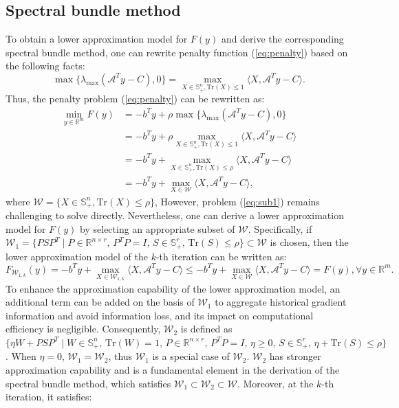 \documentclass{jcmlatex}
\begin{document}
\subsection{Spectral bundle method}
To obtain a lower approximation model for \(F(y)\) and derive the corresponding spectral bundle method, one can rewrite penalty function (\ref{eq:penalty}) based on the following facts:
\begin{equation*}
\max\{\lambda_{\max}(\mathcal{A}^{T}y-C),0\}=\underset{X\in \mathbb{S}^{n}_{+},\text{Tr}(X)\leq 1}{\max}\langle X,\mathcal{A}^{T}y-C\rangle.
\end{equation*}
Thus, the penalty problem (\ref{eq:penalty}) can be rewritten as:
\begin{equation}\label{eq:sub1}
\begin{aligned}
\underset{y\in \mathbb{R}^{m}}{\min}F(y)&=-b^{T}y+\rho\max\{\lambda_{\max}(\mathcal{A}^{T}y-C),0\}\\
&=-b^{T}y+\rho\underset{X\in \mathbb{S}^{n}_{+},\text{Tr}(X)\leq 1}{\max}\langle X,\mathcal{A}^{T}y-C\rangle\\ 
&=-b^{T}y+\underset{X\in \mathbb{S}^{n}_{+},\text{Tr}(X)\leq \rho}{\max}\langle X,\mathcal{A}^{T}y-C\rangle\\ 
&=-b^{T}y+\underset{X\in \mathcal{W}}{\max}\langle X,\mathcal{A}^{T}y-C\rangle,
\end{aligned}
\end{equation}
where \(\mathcal{W}=\{X\in \mathbb{S}^{n}_{+},\text{Tr}(X)\leq \rho\}\), However, problem (\ref{eq:sub1}) remains challenging to solve directly. Nevertheless, one can derive a lower approximation model for \( F(y) \) by selecting an appropriate subset of \( \mathcal{W} \). Specifically, if \(\mathcal{W}_{1} = \{ PSP^T \mid P \in \mathbb{R}^{n \times r},\, P^T P = I,\, S \in \mathbb{S}^r_+,\, \text{Tr}(S) \leq \rho \} \subset \mathcal{W}\) is chosen, then the lower approximation model of the \(k\)-th iteration can be written as:
\begin{equation*}
F_{\mathcal{W}_{1,k}}(y)=-b^{T}y+\underset{X\in \mathcal{W}_{1,k}}{\max}\langle X,\mathcal{A}^{T}y-C\rangle\leq-b^{T}y+\underset{X\in \mathcal{W}}{\max}\langle X,\mathcal{A}^{T}y-C\rangle=F(y),\forall y\in \mathbb{R}^{m}.
\end{equation*}
To enhance the approximation capability of the lower approximation model, an additional term can be added on the basis of \(\mathcal{W}_1\) to aggregate historical gradient information and avoid information loss, and its impact on computational efficiency is negligible. Consequently, \(\mathcal{W}_2\) is defined as \(\{ \eta W + PSP^T \mid W \in \mathbb{S}^n_+, \, \text{Tr}(W) = 1, \, P \in \mathbb{R}^{n \times r}, \, P^T P = I, \, \eta \geq 0, \, S \in \mathbb{S}^r_+, \, \eta + \text{Tr}(S) \leq \rho \}\). When \(\eta = 0\), \(\mathcal{W}_1 = \mathcal{W}_2\), thus \(\mathcal{W}_1\) is a special case of \(\mathcal{W}_2\). \(\mathcal{W}_2\) has stronger approximation capability and is a fundamental element in the derivation of the spectral bundle method, which satisfies \(\mathcal{W}_1 \subset \mathcal{W}_2 \subset \mathcal{W}\). Moreover, at the \(k\)-th iteration, it satisfies:
\end{document}
